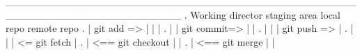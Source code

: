 
________________________________________________________________________
. Working director       staging area      local repo        remote repo 
.        |   git add =>        |                |                  |
.        |                     | git commit=>   |                  |
.        |                     |                |   git push =>    |         
.        |                     |                |   <= git fetch   |
.        |              <== git checkout        |                  |
.        |               <==  git merge         |                  |

